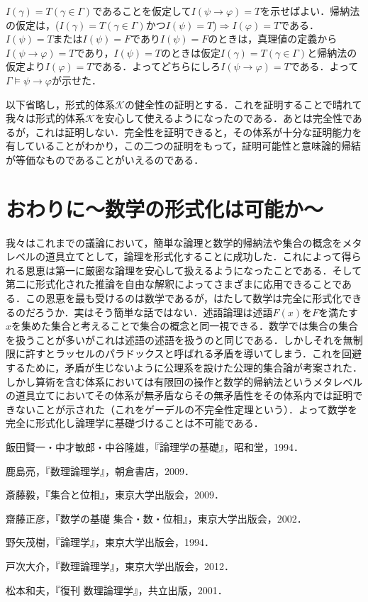 \documentclass[10pt,b5paper,papersize,dvipdfmx]{jsbook}
\begin{document}
$I(\gamma)=T(\gamma \in \Gamma)$であることを仮定して$I(\psi \to \varphi)=T$を示せばよい．帰納法の仮定は，($I(\gamma)=T(\gamma \in \Gamma)$かつ$I(\psi)=T$)$\Rightarrow$$I(\varphi)=T$である．$I(\psi) = T$または$I(\psi) = F$であり$I(\psi) = F$のときは，真理値の定義から$I(\psi \to \varphi)=T$であり，$I(\psi) = T$のときは仮定$I(\gamma)=T(\gamma \in \Gamma)$と帰納法の仮定より$I(\varphi)=T$である．よってどちらにしろ$I(\psi \to \varphi)=T$である．よって$\Gamma \models \psi \to \varphi$が示せた．\par
以下省略し，形式的体系$\mathcal K$の健全性の証明とする．これを証明することで晴れて我々は形式的体系$\mathcal K$を安心して使えるようになったのである．あとは完全性であるが，これは証明しない．完全性を証明できると，その体系が十分な証明能力を有していることがわかり，この二つの証明をもって，証明可能性と意味論的帰結が等価なものであることがいえるのである．

\section{おわりに～数学の形式化は可能か～}
我々はこれまでの議論において，簡単な論理と数学的帰納法や集合の概念をメタレベルの道具立てとして，論理を形式化することに成功した．これによって得られる恩恵は第一に厳密な論理を安心して扱えるようになったことである．そして第二に形式化された推論を自由な解釈によってさまざまに応用できることである．この恩恵を最も受けるのは数学であるが，はたして数学は完全に形式化できるのだろうか．実はそう簡単な話ではない．述語論理は述語$F(x)$を$F$を満たす$x$を集めた集合と考えることで集合の概念と同一視できる．数学では集合の集合を扱うことが多いがこれは述語の述語を扱うのと同じである．しかしそれを無制限に許すとラッセルのパラドックスと呼ばれる矛盾を導いてしまう．これを回避するために，矛盾が生じないように公理系を設けた公理的集合論が考案された．しかし算術を含む体系においては有限回の操作と数学的帰納法というメタレベルの道具立てにおいてその体系が無矛盾ならその無矛盾性をその体系内では証明できないことが示された（これをゲーデルの不完全性定理という）．よって数学を完全に形式化し論理学に基礎づけることは不可能である．

\clearpage
\begin{thebibliography}{99}
  \item 飯田賢一・中才敏郎・中谷隆雄，『論理学の基礎』，昭和堂，1994．
  \item 鹿島亮，『数理論理学』，朝倉書店，2009．
  \item 斎藤毅，『集合と位相』，東京大学出版会，2009．
  \item 齋藤正彦，『数学の基礎 集合・数・位相』，東京大学出版会，2002．
  \item 野矢茂樹，『論理学』，東京大学出版会，1994．
  \item 戸次大介，『数理論理学』，東京大学出版会，2012．
  \item 松本和夫，『復刊 数理論理学』，共立出版，2001．
\end{thebibliography}
\end{document}
